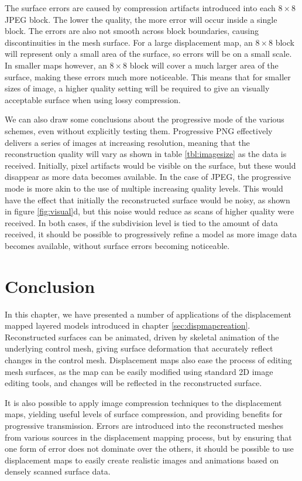 The surface errors are caused by compression artifacts introduced into each $8\times8$ JPEG block. The lower the quality, the more error will occur inside a single block. The errors are also not smooth across block boundaries, causing discontinuities in the mesh surface. For a large displacement map, an $8\times8$ block will represent only a small area of the surface, so errors will be on a small scale. In smaller maps however, an $8\times8$ block will cover a much larger area of the surface, making these errors much more noticeable. This means that for smaller sizes of image, a higher quality setting will be required to give an visually acceptable surface when using lossy compression.

We can also draw some conclusions about the progressive mode of the various schemes, even without explicitly testing them. Progressive PNG effectively delivers a series of images at increasing resolution, meaning that the reconstruction quality will vary as shown in table \ref{tbl:imagesize} as the data is received. Initially, pixel artifacts would be visible on the surface, but these would disappear as more data becomes available. In the case of JPEG, the progressive mode is more akin to the use of multiple increasing quality levels. This would have the effect that initially the reconstructed surface would be noisy, as shown in figure \ref{fig:visual}d, but this noise would reduce as scans of higher quality were received. In both cases, if the subdivision level is tied to the amount of data received, it should be possible to progressively refine a model as more image data becomes available, without surface errors becoming noticeable.

\section{\label{sec:dispmapanim:conclusion}Conclusion}

In this chapter, we have presented a number of applications of the displacement mapped layered models introduced in chapter \ref{sec:dispmapcreation}. Reconstructed surfaces can be animated, driven by skeletal animation of the underlying control mesh, giving surface deformation that accurately reflect changes in the control mesh. Displacement maps also ease the process of editing mesh surfaces, as the map can be easily modified using standard 2D image editing tools, and changes will be reflected in the reconstructed surface. 

It is also possible to apply image compression techniques to the displacement maps, yielding useful levels of surface compression, and providing benefits for progressive transmission. Errors are introduced into the reconstructed meshes from various sources in the displacement mapping process, but by ensuring that one form of error does not dominate over the others, it should be possible to use displacement maps to easily create realistic images and animations based on densely scanned surface data.
